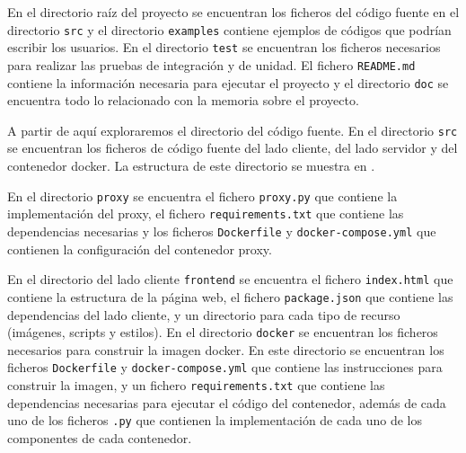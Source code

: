 En el directorio raíz del proyecto se encuentran los ficheros del código fuente en el directorio \texttt{src} y el directorio \texttt{examples} contiene ejemplos de códigos que podrían escribir los usuarios. En el directorio \texttt{test} se encuentran los ficheros necesarios para realizar las pruebas de integración y de unidad. El fichero \texttt{README.md} contiene la información necesaria para ejecutar el proyecto y el directorio \texttt{doc} se encuentra todo lo relacionado con la memoria sobre el proyecto.

A partir de aquí exploraremos el directorio del código fuente. En el directorio \texttt{src} se encuentran los ficheros de código fuente del lado cliente, del lado servidor y del contenedor docker. La estructura de este directorio se muestra en .


\begin{figure}[htb]
    {
    \begin{tcolorbox}
    \end{tcolorbox}
    }
\end{figure}

En el directorio \texttt{proxy} se encuentra el fichero \texttt{proxy.py} que contiene la implementación del proxy, el fichero \texttt{requirements.txt} que contiene las dependencias necesarias y los ficheros \texttt{Dockerfile} y \texttt{docker-compose.yml} que contienen la configuración del contenedor proxy.

En el directorio del lado cliente \texttt{frontend} se encuentra el fichero \texttt{index.html} que contiene la estructura de la página web, el fichero \texttt{package.json} que contiene las dependencias del lado cliente, y un directorio para cada tipo de recurso (imágenes, scripts y estilos). 
En el directorio \texttt{docker} se encuentran los ficheros necesarios para construir la imagen docker. En este directorio se encuentran los ficheros \texttt{Dockerfile} y \texttt{docker-compose.yml} que contiene las instrucciones para construir la imagen, y un fichero \texttt{requirements.txt} que contiene las dependencias necesarias para ejecutar el código del contenedor, además de cada uno de los ficheros \texttt{.py} que contienen la implementación de cada uno de los componentes de cada contenedor.  

